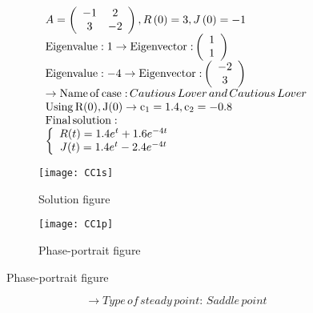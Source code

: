 \documentclass[a4paper]{article}
\begin{document}
\[\begin{array}{l}
A = \left( {\begin{array}{*{20}{c}}
{ - 1}&2\\
3&{ - 2}
\end{array}} \right),R\left( 0 \right) = 3,J\left( 0 \right) =  - 1\\
{\rm{Eigenvalue:1}} \to {\rm{Eigenvector:}}\left( {\begin{array}{*{20}{c}}
1\\
1
\end{array}} \right)\\
{\rm{Eigenvalue: - 4}} \to {\rm{Eigenvector:}}\left( {\begin{array}{*{20}{c}}
{ - 2}\\
3
\end{array}} \right)\\
 \to {\rm{Name}}\,{\rm{of}}\,{\rm{case:}}\,Cautious\,Lover\,and\,Cautious\,Lover\\
{\rm{Using}}\,{\rm{R(0), J(0)}} \to {{\rm{c}}_1} = 1.4,{\rm{ }}{{\rm{c}}_2} =  - 0.8\\
{\rm{Final}}\,{\rm{solution:}}\\
\left\{ {\begin{array}{*{20}{c}}
{R(t) = 1.4{e^t} + 1.6{e^{ - 4t}}}\\
{J(t) = 1.4{e^t} - 2.4{e^{ - 4t}}}
\end{array}} \right.
\end{array}\]
\begin{figure}[H]
\centering
\begin{subfigure}{.5\textwidth}
  \centering
  \texttt{[image: CC1s]}
  \caption*{Solution figure}
\end{subfigure}%
\begin{subfigure}{.5\textwidth}
  \centering
  \texttt{[image: CC1p]}
  \caption*{Phase-portrait figure}
\end{subfigure}
\end{figure}
\[  \to  Type\,of\,steady\,point:\,Saddle\,point\]
\end{document}
